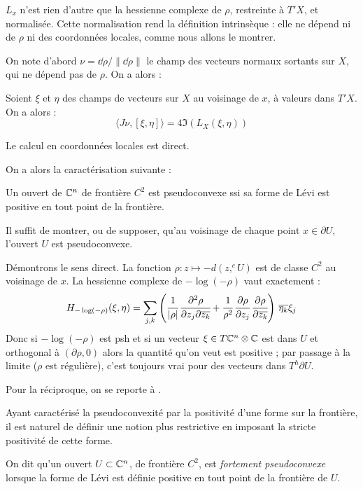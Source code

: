 $L_x$ n'est rien d'autre que la hessienne complexe de $\rho$, restreinte à $T'X$, et normalisée. Cette normalisation rend la définition intrinsèque : elle ne dépend ni de $\rho$ ni des coordonnées locales, comme nous allons le montrer.

On note d'abord $\nu = \dd \rho/\|\dd \rho\|$ le champ des vecteurs normaux sortants sur $X$, qui ne dépend pas de $\rho$. On a alors :

\begin{prop}
	Soient $\xi$ et $\eta$ des champs de vecteurs sur $X$ au voisinage de $x$, à valeurs dans $T'X$. On a alors :
	\begin{equation*}
		\langle J\nu,[\xi,\eta]\rangle =4\Im(L_X(\xi,\eta))
	\end{equation*}
\end{prop}
\begin{preuve}
	Le calcul en coordonnées locales est direct.
\end{preuve}
On a alors la caractérisation suivante :
\begin{prop}
	Un ouvert de $\mathbb{C}^n$ de frontière $C^2$ est pseudoconvexe ssi sa forme de Lévi est positive en tout point de la frontière.
\end{prop}
\begin{preuve}
Il suffit de montrer, ou de supposer, qu'au voisinage de chaque point $x \in \partial U$, l'ouvert $U$ est pseudoconvexe.

Démontrons le sens direct. La fonction $\rho:z \mapsto -d(z,^cU)$ est de classe $C^2$ au voisinage de $x$. La hessienne complexe de $-\log(-\rho)$ vaut exactement :
\begin{equation*}
H_{-\log(-\rho)}(\xi,\eta)=\sum_{j,k}\left(\cfrac{1}{|\rho|}\,\cfrac{\partial^2\rho}{\partial z_j\partial \overline{z_k}} + \cfrac{1}{\rho^2}\,\cfrac{\partial \rho}{\partial z_j}\,\cfrac{\partial \rho}{\partial \overline{z_k}}\right)\,\overline{\eta_k}\xi_j
\end{equation*}
Donc si $-\log(-\rho)$ est psh et si un vecteur $\xi \in T\mathbb{C}^n \otimes \mathbb{C}$ est dans $U$ et orthogonal à $(\partial \rho,0)$ alors la quantité qu'on veut est positive ; par passage à la limite ($\rho$ est régulière), c'est toujours vrai pour des vecteurs dans $T^h\partial U$.

Pour la réciproque, on se reporte à \cite{Demailly}.
\end{preuve}

Ayant caractérisé la pseudoconvexité par la positivité d'une forme sur la frontière, il est naturel de définir une notion plus restrictive en imposant la stricte positivité de cette forme.
\begin{defn}
On dit qu'un ouvert $U \subset \mathbb{C}^n$, de frontière $C^2$, est \emph{fortement pseudoconvexe} lorsque la forme de Lévi est définie positive en tout point de la frontière de $U$.
\end{defn}
